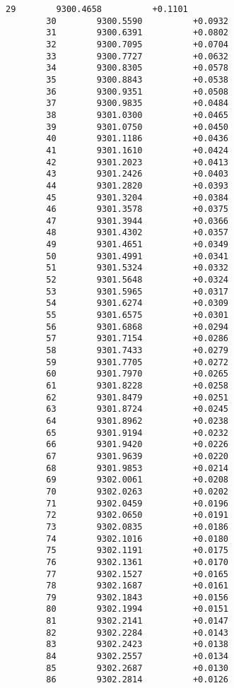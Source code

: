 \documentclass[11pt]{article}
\begin{document}
\begin{Verbatim}[commandchars=\\\{\}]
        29        9300.4658          +0.1101
        30        9300.5590          +0.0932
        31        9300.6391          +0.0802
        32        9300.7095          +0.0704
        33        9300.7727          +0.0632
        34        9300.8305          +0.0578
        35        9300.8843          +0.0538
        36        9300.9351          +0.0508
        37        9300.9835          +0.0484
        38        9301.0300          +0.0465
        39        9301.0750          +0.0450
        40        9301.1186          +0.0436
        41        9301.1610          +0.0424
        42        9301.2023          +0.0413
        43        9301.2426          +0.0403
        44        9301.2820          +0.0393
        45        9301.3204          +0.0384
        46        9301.3578          +0.0375
        47        9301.3944          +0.0366
        48        9301.4302          +0.0357
        49        9301.4651          +0.0349
        50        9301.4991          +0.0341
        51        9301.5324          +0.0332
        52        9301.5648          +0.0324
        53        9301.5965          +0.0317
        54        9301.6274          +0.0309
        55        9301.6575          +0.0301
        56        9301.6868          +0.0294
        57        9301.7154          +0.0286
        58        9301.7433          +0.0279
        59        9301.7705          +0.0272
        60        9301.7970          +0.0265
        61        9301.8228          +0.0258
        62        9301.8479          +0.0251
        63        9301.8724          +0.0245
        64        9301.8962          +0.0238
        65        9301.9194          +0.0232
        66        9301.9420          +0.0226
        67        9301.9639          +0.0220
        68        9301.9853          +0.0214
        69        9302.0061          +0.0208
        70        9302.0263          +0.0202
        71        9302.0459          +0.0196
        72        9302.0650          +0.0191
        73        9302.0835          +0.0186
        74        9302.1016          +0.0180
        75        9302.1191          +0.0175
        76        9302.1361          +0.0170
        77        9302.1527          +0.0165
        78        9302.1687          +0.0161
        79        9302.1843          +0.0156
        80        9302.1994          +0.0151
        81        9302.2141          +0.0147
        82        9302.2284          +0.0143
        83        9302.2423          +0.0138
        84        9302.2557          +0.0134
        85        9302.2687          +0.0130
        86        9302.2814          +0.0126

\end{Verbatim}
\end{document}
